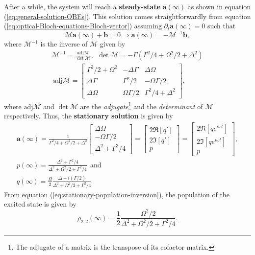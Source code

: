 After a while, the system will reach a \textbf{steady-state} $ \mathbf{a}(\infty) $ as shown in equation (\ref{eq:general-solution-OBEs}). This solution comes straightforwardly from equation (\ref{eq:optical-Bloch-equations-Bloch-vector}) assuming $ \partial_t \mathbf{a}(\infty) = 0 $ such that
\begin{equation}
	\mathcal{M} \mathbf{a}(\infty) + \mathbf{b} = 0 \Rightarrow \mathbf{a}(\infty) = - \mathcal{M}^{-1}\mathbf{b},
\end{equation}
where $ \mathcal{M}^{-1} $ is the inverse of $ \mathcal{M} $ given by
\begin{gather}
	\mathcal{M}^{-1} = \frac{\textrm{adj}\mathcal{M}}{\det \mathcal{M}},\ \ \det\mathcal{M} = -\Gamma (\Gamma^2/4 + \Omega^2 /2 + \Delta^2) \\ \ \textrm{adj}\mathcal{M} = 
	\left[ \begin{matrix} 
		\Gamma^2 / 2 + \Omega^2 & -\Delta \Gamma & \Delta \Omega  \\
		\Delta \Gamma & \Gamma^2/2 & -\Omega \Gamma/2\\
		\Delta \Omega & \Omega \Gamma/2 & \Gamma^2 / 4 + \Delta^2
	\end{matrix} \right],
\end{gather}
where $ \textrm{adj}\mathcal{M} $ and $ \det \mathcal{M} $ are the \textit{adjugate}\footnote{The adjugate of a matrix is the transpose of its cofactor matrix.} and the \textit{determinant} of $ \mathcal{M} $ respectively. Thus, the \textbf{stationary solution} is given by
\begin{gather}
	\mathbf{a}(\infty) = \frac{1}{\Gamma^2 / 4 + \Omega^2 / 2 + \Delta^2} \left[ \begin{matrix} \Delta \Omega\\ -\Omega \Gamma/2 \\ \Delta^2 + \Gamma^2/4 \end{matrix} \right] = \left[ \begin{matrix} 2 \Re[q'] \\ 2\Im[q'] \\ p \end{matrix} \right] = \left[ \begin{matrix} 2 \Re[qe^{i \omega t}] \\ 2\Im[qe^{i \omega t}] \\ p \end{matrix} \right],
	\label{eq:stationary-solution-OBEs}
	\\
	p(\infty) = \frac{\Delta^2 + \Gamma^2/4}{\Delta^2 + \Omega^2 / 2 + \Gamma^2 / 4}\ \ \textrm{and} 
	\label{eq:stationary-population-inversion}
	\\
	q(\infty) = \frac{\Omega}{2} \frac{\Delta - i (\Gamma / 2)}{\Delta^2 + \Omega^2 / 2 + \Gamma^2 / 4}
	\label{eq:stationary-coherence}
\end{gather}
From equation (\ref{eq:stationary-population-inversion}), the population of the excited state is given by
\begin{equation}
	\rho_{2,2}(\infty) = \frac{1}{2}\frac{\Omega^2 / 2}{\Delta^2 + \Omega^2 / 2 + \Gamma^2/4}.
	\label{eq:stationary-excited-state-population}
\end{equation}

